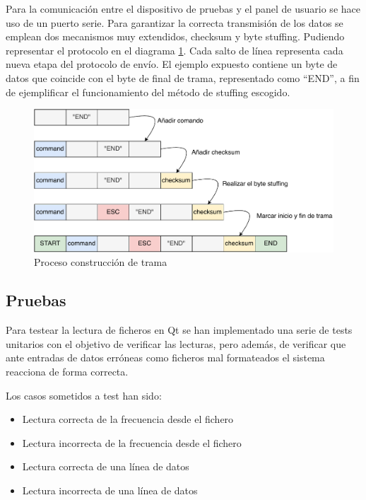         Para la comunicación entre el dispositivo de pruebas y el panel de usuario se hace uso de un puerto serie. Para garantizar la correcta transmisión de los datos se emplean dos mecanismos muy extendidos, checksum y byte stuffing. Pudiendo representar el protocolo en el diagrama \ref{fig:frame}. Cada salto de línea representa cada nueva etapa del protocolo de envío. El ejemplo expuesto contiene un byte de datos que coincide con el byte de final de trama, representado como “END”, a fin de ejemplificar el funcionamiento del método de stuffing escogido.

        \begin{figure}[H]
                \centering
                        \includegraphics[width = \linewidth]{figuras/ProtocoloCom.pdf}
                \caption{Proceso construcción de trama}
                \label{fig:frame}
        \end{figure}

    \subsection{Pruebas}

        Para testear la lectura de ficheros en Qt se han implementado una serie de tests unitarios con el objetivo de verificar las lecturas, pero además, de verificar que ante entradas de datos erróneas como ficheros mal formateados el sistema reacciona de forma correcta.

        Los casos sometidos a test han sido:

        \begin{itemize}
                \item Lectura correcta de la frecuencia desde el fichero
                \item Lectura incorrecta de la frecuencia desde el fichero
                \item Lectura correcta de una línea de datos
                \item Lectura incorrecta de una línea de datos
        \end{itemize}

